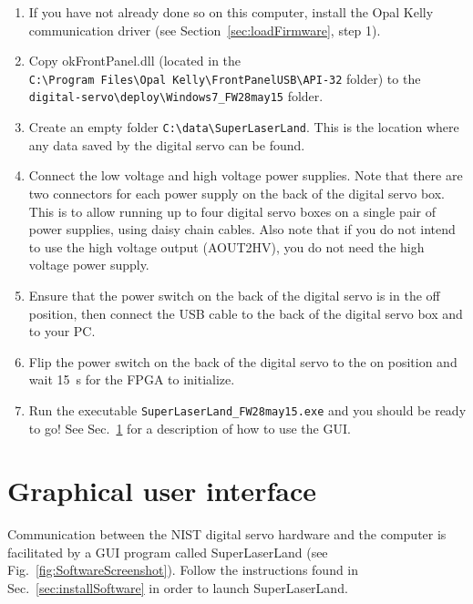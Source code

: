 \documentclass[aip,rsi,preprint,graphicx]{revtex4-1}
\begin{document}
\begin{enumerate}
\item If you have not already done so on this computer, install the Opal Kelly communication driver (see Section~\ref{sec:loadFirmware}, step 1).
\item Copy okFrontPanel.dll (located in the \\{\tt C:\textbackslash Program~Files\textbackslash Opal~Kelly\textbackslash FrontPanelUSB\textbackslash API-32} folder) to the \\{\tt digital-servo\textbackslash deploy\textbackslash Windows7\_FW28may15} folder.
\item Create an empty folder {\tt C:\textbackslash data\textbackslash SuperLaserLand}.  This is the location where any data saved by the digital servo can be found.
\item Connect the low voltage and high voltage power supplies.  Note that there are two connectors for each power supply on the back of the digital servo box.  This is to allow running up to four digital servo boxes on a single pair of power supplies, using daisy chain cables.  Also note that if you do not intend to use the high voltage output (AOUT2HV), you do not need the high voltage power supply.
\item Ensure that the power switch on the back of the digital servo is in the off position, then connect the USB cable to the back of the digital servo box and to your PC.
\item Flip the power switch on the back of the digital servo to the on position and wait 15~s for the FPGA to initialize.
\item Run the executable {\tt SuperLaserLand\_FW28may15.exe} and you should be ready to go!  See Sec.~\ref{sec:software} for a description of how to use the GUI.
\end{enumerate}

\section{Graphical user interface}\label{sec:software}

Communication between the NIST digital servo hardware and the computer is facilitated by a GUI program called SuperLaserLand (see Fig.~\ref{fig:SoftwareScreenshot}).  Follow the instructions found in Sec.~\ref{sec:installSoftware} in order to launch SuperLaserLand.
\end{document}
